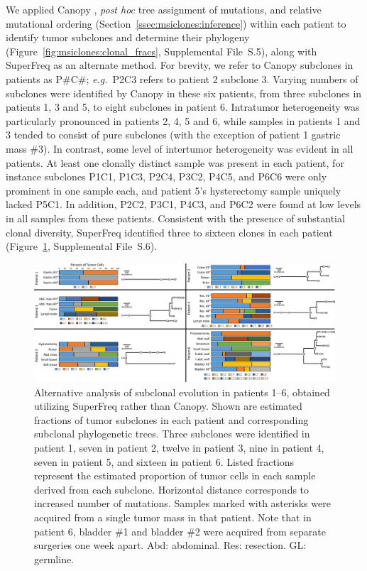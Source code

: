 We applied Canopy \cite{canopy}, \textit{post hoc} tree assignment of mutations, and relative mutational ordering (Section~\ref{ssec:msiclones:inference}) within each patient to identify tumor subclones and determine their phylogeny (Figure~\ref{fig:msiclones:clonal_fracs}, Supplemental File~S\thechapter{}.5), along with SuperFreq \cite{flensburg2020} as an alternate method. For brevity, we refer to Canopy subclones in patients as P\#C\#; \textit{e.g.}\ P2C3 refers to patient 2 subclone 3. Varying numbers of subclones were identified by Canopy in these six patients, from three subclones in patients 1, 3 and 5, to eight subclones in patient 6. Intratumor heterogeneity was particularly pronounced in patients 2, 4, 5 and 6, while samples in patients 1 and 3 tended to consist of pure subclones (with the exception of patient 1 gastric mass \#3). In contrast, some level of intertumor heterogeneity was evident in all patients. At least one clonally distinct sample was present in each patient, for instance subclones P1C1, P1C3, P2C4, P3C2, P4C5, and P6C6 were only prominent in one sample each, and patient 5's hysterectomy sample uniquely lacked P5C1. In addition, P2C2, P3C1, P4C3, and P6C2 were found at low levels in all samples from these patients. Consistent with the presence of substantial clonal diversity, SuperFreq identified three to sixteen clones in each patient (Figure~\ref{fig:msiclones:sf_results}, Supplemental File~S\thechapter{}.6).

\begin{figure}[ht]
	\centering
	\includegraphics[width=\textwidth,height=0.83\textheight,keepaspectratio]{images/msiclones/sf_results_combined}
	\caption[Alternative subclonal inference using SuperFreq.]{Alternative analysis of subclonal evolution in patients 1--6, obtained utilizing SuperFreq rather than Canopy. Shown are estimated fractions of tumor subclones in each patient and corresponding subclonal phylogenetic trees. Three subclones were identified in patient 1, seven in patient 2, twelve in patient 3, nine in patient 4, seven in patient 5, and sixteen in patient 6. Listed fractions represent the estimated proportion of tumor cells in each sample derived from each subclone. Horizontal distance corresponds to increased number of mutations. Samples marked with asterisks were acquired from a single tumor mass in that patient. Note that in patient 6, bladder \#1 and bladder \#2 were acquired from separate surgeries one week apart. Abd: abdominal. Res: resection. GL: germline.}
	\label{fig:msiclones:sf_results}
\end{figure}

